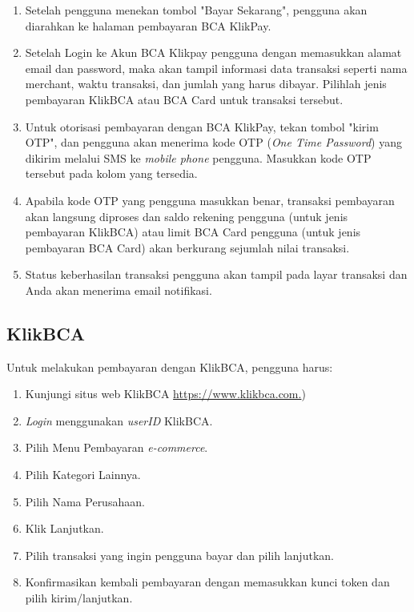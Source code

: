 \begin{enumerate}
    \item Setelah pengguna menekan tombol "Bayar Sekarang", pengguna akan diarahkan ke halaman pembayaran BCA KlikPay.
    \item Setelah Login ke Akun BCA Klikpay pengguna dengan memasukkan alamat email dan password, maka akan tampil informasi data transaksi seperti nama merchant, waktu transaksi, dan jumlah yang harus dibayar. Pilihlah jenis pembayaran KlikBCA atau BCA Card untuk transaksi tersebut.
    \item Untuk otorisasi pembayaran dengan BCA KlikPay, tekan tombol "kirim OTP", dan pengguna akan menerima kode OTP (\textit{One Time Password}) yang dikirim melalui SMS ke \textit{mobile phone} pengguna. Masukkan kode OTP tersebut pada kolom yang tersedia.
    \item Apabila kode OTP yang pengguna masukkan benar, transaksi pembayaran akan langsung diproses dan saldo rekening pengguna (untuk jenis pembayaran KlikBCA) atau limit BCA Card pengguna (untuk jenis pembayaran BCA Card) akan berkurang sejumlah nilai transaksi.
    \item Status keberhasilan transaksi pengguna akan tampil pada layar transaksi dan Anda akan menerima email notifikasi.
\end{enumerate}

\subsection{KlikBCA}
\label{subsec:klikbca}
Untuk melakukan pembayaran dengan KlikBCA, pengguna harus:

\begin{enumerate}
    \item Kunjungi situs web KlikBCA \href{https://www.klikbca.com.}{https://www.klikbca.com.})
    \item \textit{Login} menggunakan \textit{userID} KlikBCA.
    \item Pilih Menu Pembayaran \textit{e-commerce}.
    \item Pilih Kategori Lainnya.
    \item Pilih Nama Perusahaan.
    \item Klik Lanjutkan.
    \item Pilih transaksi yang ingin pengguna bayar dan pilih lanjutkan.
    \item Konfirmasikan kembali pembayaran dengan memasukkan kunci token dan pilih kirim/lanjutkan.
\end{enumerate}

